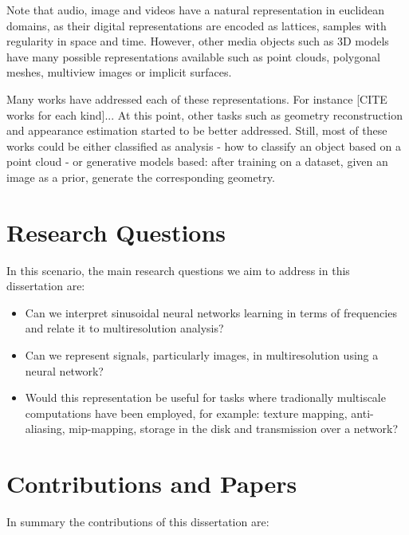 Note that audio, image and videos have a natural representation in euclidean domains, as their digital representations are encoded as lattices, samples with regularity in space and time. However, other media objects such as 3D models have many possible representations available such as point clouds, polygonal meshes, multiview images or implicit surfaces.



Many works have addressed each of these representations. For instance [CITE works for each kind]... At this point, other tasks such as geometry reconstruction and appearance estimation started to be better addressed. Still, most of these works could be either classified as analysis - how to classify an object based on a point cloud - or generative models based: after training on a dataset, given an image as a prior, generate the corresponding geometry.


\section{Research Questions}

In this scenario, the main research questions we aim to address in this dissertation are:

\begin{itemize}
    \item Can we interpret sinusoidal neural networks learning in terms of frequencies and relate it to multiresolution analysis? 
    \item Can we represent signals, particularly images, in multiresolution using a neural network?
    \item Would this representation be useful for tasks where tradionally multiscale computations have been employed, for example: texture mapping, anti-aliasing, mip-mapping, storage in the disk and transmission over a network?
\end{itemize}  

\section{Contributions and Papers}

In summary the contributions of this dissertation are:

